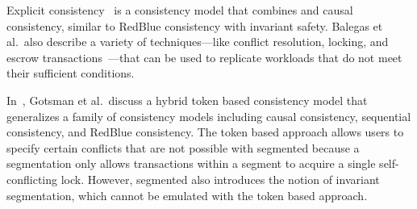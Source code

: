 Explicit consistency~\cite{balegas2015towards} is a consistency model that
combines \invariantconfluence{} and causal consistency, similar to RedBlue
consistency with invariant safety.
%
Balegas et al.\ also describe a variety of techniques---like conflict
resolution, locking, and escrow transactions~\cite{o1986escrow}---that can be
used to replicate workloads that do not meet their sufficient conditions.

In~\cite{gotsman2016cause}, Gotsman et al.\ discuss a hybrid token based
consistency model that generalizes a family of consistency models including
causal consistency, sequential consistency, and RedBlue consistency.
The token based approach allows users to
specify certain conflicts that are not possible with segmented
\invariantconfluence{} because a segmentation only allows transactions within a
segment to acquire a single self-conflicting lock. However, segmented
\invariantconfluence{} also introduces the notion of invariant segmentation,
which cannot be emulated with the token based approach.


